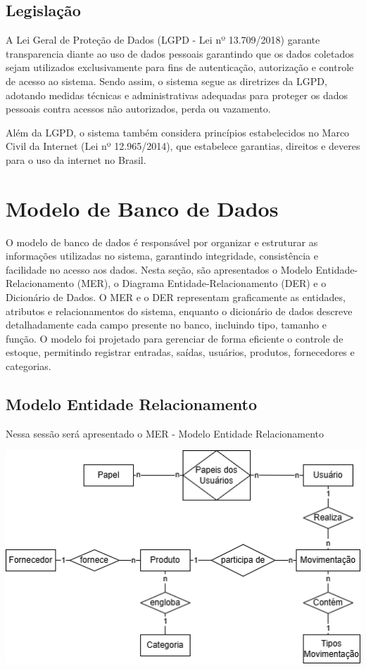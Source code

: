 \documentclass[
	12pt,				%
	openany,			%
	twoside,			%
	a4paper,			%
	english,			%
	brazil				%
	]{abntex2}
\begin{document}
\subsection{Legislação}

A  Lei Geral de Proteção de Dados (LGPD - Lei nº 13.709/2018) garante transparencia diante ao uso de dados pessoais garantindo que os dados coletados sejam utilizados exclusivamente para fins de autenticação, autorização e controle de acesso ao sistema. Sendo assim, o sistema segue as diretrizes da LGPD, adotando medidas técnicas e administrativas adequadas para proteger os dados pessoais contra acessos não autorizados, perda ou vazamento. 

Além da LGPD, o sistema também considera princípios estabelecidos no Marco Civil da Internet (Lei nº 12.965/2014), que estabelece garantias, direitos e deveres para o uso da internet no Brasil.




\section{Modelo de Banco de Dados}

O modelo de banco de dados é responsável por organizar e estruturar as informações utilizadas no sistema, garantindo integridade, consistência e facilidade no acesso aos dados. Nesta seção, são apresentados o Modelo Entidade-Relacionamento (MER), o Diagrama Entidade-Relacionamento (DER) e o Dicionário de Dados. O MER e o DER representam graficamente as entidades, atributos e relacionamentos do sistema, enquanto o dicionário de dados descreve detalhadamente cada campo presente no banco, incluindo tipo, tamanho e função. O modelo foi projetado para gerenciar de forma eficiente o controle de estoque, permitindo registrar entradas, saídas, usuários, produtos, fornecedores e categorias.

\subsection{Modelo Entidade Relacionamento}
Nessa sessão será apresentado o MER - Modelo Entidade Relacionamento

\includegraphics[width=1.0\textwidth]{Figuras/MERestoque.png}
\end{document}
